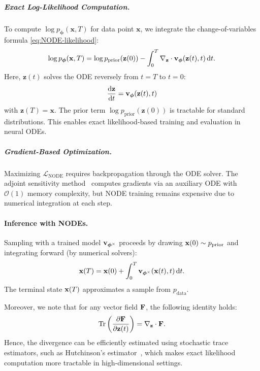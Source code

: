 \subparagraph{Exact Log-Likelihood Computation.} 
To compute $\log p_{\bm{\phi}}(\mathbf{x}, T)$ for data point $\mathbf{x}$, we integrate the change-of-variables formula \eqref{eq:NODE-likelihood}:
\begin{align}
\log p_{\bm{\phi}}(\mathbf{x}, T) = \log p_{\text{prior}}(\mathbf{z}(0)) - \int_0^T \nabla_{\mathbf{z}} \cdot \mathbf{v}_{\bm{\phi}}(\mathbf{z}(t), t) \mathop{}\!\mathrm{d} t.
\end{align}
Here, $\mathbf{z}(t)$ solves the ODE reversely from $t = T$ to $t = 0$:
\[
\frac{\mathop{}\!\mathrm{d}\mathbf{z}}{\mathop{}\!\mathrm{d} t} = \mathbf{v}_{\bm{\phi}}(\mathbf{z}(t), t)
\]
with $\mathbf{z}(T) = \mathbf{x}$. The prior term $\log p_{\text{prior}}(\mathbf{z}(0))$ is tractable for standard distributions. This enables exact likelihood-based training and evaluation in neural ODEs.

\subparagraph{Gradient-Based Optimization.}  
Maximizing $\mathcal{L}_{\text{NODE}}$ requires backpropagation through the ODE solver. The adjoint sensitivity method~\citep{pontryagin2018mathematical, chen2018neural} computes gradients via an auxiliary ODE with $\mathcal{O}(1)$ memory complexity, but NODE training remains expensive due to numerical integration at each step.

\paragraph{Inference with NODEs.}  
Sampling with a trained model ${\mathbf{v}}_{\bm{\phi}^\times}$ proceeds by drawing ${\mathbf{x}}(0) \sim p_{\text{prior}}$ and integrating forward (by numerical solvers):
\[
{\mathbf{x}}(T) = {\mathbf{x}}(0) + \int_0^T {\mathbf{v}}_{\bm{\phi}^\times}({\mathbf{x}}(t), t)   \mathop{}\!\mathrm{d} t.
\]
The terminal state ${\mathbf{x}}(T)$ approximates a sample from $p_{\text{data}}$.

Moreover, we note that for any vector field ${\mathbf{F}}$, the following identity holds:
\[
    \operatorname{Tr}\left(\frac{\partial {\mathbf{F}}}{\partial {\mathbf{z}}(t)} \right) = \nabla_{{\mathbf{z}}} \cdot {\mathbf{F}}.
\]
Hence, the divergence can be efficiently estimated using stochastic trace estimators, such as Hutchinson’s estimator~\citep{hutchinson1989stochastic}, which makes exact likelihood computation more tractable in high-dimensional settings.


